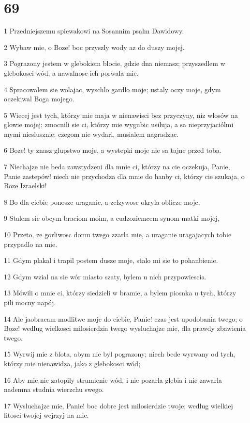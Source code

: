 \chapter{69}

\par 1 Przedniejszemu spiewakowi na Sosannim psalm Dawidowy.
\par 2 Wybaw mie, o Boze! boc przyszly wody az do duszy mojej.
\par 3 Pograzony jestem w glebokiem blocie, gdzie dna niemasz; przyszedlem w glebokosci wód, a nawalnosc ich porwala mie.
\par 4 Spracowalem sie wolajac, wyschlo gardlo moje; ustaly oczy moje, gdym oczekiwal Boga mojego.
\par 5 Wiecej jest tych, którzy mie maja w nienawisci bez przyczyny, niz wlosów na glowie mojej; zmocnili sie ci, którzy mie wygubic usiluja, a sa nieprzyjaciólmi mymi nieslusznie; czegom nie wydarl, musialem nagradzac.
\par 6 Boze! ty znasz glupstwo moje, a wystepki moje nie sa tajne przed toba.
\par 7 Niechajze nie beda zawstydzeni dla mnie ci, którzy na cie oczekuja, Panie, Panie zastepów! niech nie przychodza dla mnie do hanby ci, którzy cie szukaja, o Boze Izraelski!
\par 8 Bo dla ciebie ponosze uraganie, a zelzywosc okryla oblicze moje.
\par 9 Stalem sie obcym braciom moim, a cudzoziemcem synom matki mojej,
\par 10 Przeto, ze gorliwosc domu twego zzarla mie, a uraganie uragajacych tobie przypadlo na mie.
\par 11 Gdym plakal i trapil postem dusze moje, stalo mi sie to pohanbienie.
\par 12 Gdym wzial na sie wór miasto szaty, bylem u nich przypowiescia.
\par 13 Mówili o mnie ci, którzy siedzieli w bramie, a bylem piosnka u tych, którzy pili mocny napój.
\par 14 Ale jaobracam modlitwe moje do ciebie, Panie! czas jest upodobania twego; o Boze! wedlug wielkosci milosierdzia twego wysluchajze mie, dla prawdy zbawienia twego.
\par 15 Wyrwij mie z blota, abym nie byl pograzony; niech bede wyrwany od tych, którzy mie nienawidza, jako z glebokosci wód;
\par 16 Aby mie nie zatopily strumienie wód, i nie pozarla glebia i nie zawarla nademna studnia wierzchu swego.
\par 17 Wysluchajze mie, Panie! boc dobre jest milosierdzie twoje; wedlug wielkiej litosci twojej wejrzyj na mie.
